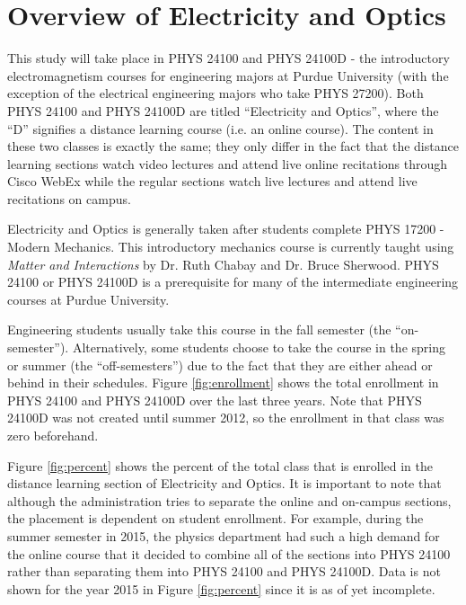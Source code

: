 \section{Overview of Electricity and Optics}

This study will take place in PHYS 24100 and PHYS 24100D - the introductory electromagnetism courses for engineering majors at Purdue University (with the exception of the electrical engineering majors who take PHYS 27200). Both PHYS 24100 and PHYS 24100D are titled ``Electricity and Optics'', where the ``D'' signifies a distance learning course (i.e. an online course). The content in these two classes is exactly the same; they only differ in the fact that the distance learning sections watch video lectures and attend live online recitations through Cisco WebEx while the regular sections watch live lectures and attend live recitations on campus.

Electricity and Optics is generally taken after students complete PHYS 17200 - Modern Mechanics. This introductory mechanics course is currently taught using \textit{Matter and Interactions} by Dr. Ruth Chabay and Dr. Bruce Sherwood\cite{chabay2010}. PHYS 24100 or PHYS 24100D is a prerequisite for many of the intermediate engineering courses at Purdue University.

Engineering students usually take this course in the fall semester (the ``on-semester''). Alternatively, some students choose to take the course in the spring or summer (the ``off-semesters'') due to the fact that they are either ahead or behind in their schedules. Figure \ref{fig:enrollment} shows the total enrollment in PHYS 24100 and PHYS 24100D over the last three years. Note that PHYS 24100D was not created until summer 2012, so the enrollment in that class was zero beforehand.

Figure \ref{fig:percent} shows the percent of the total class that is enrolled in the distance learning section of Electricity and Optics. It is important to note that although the administration tries to separate the online and on-campus sections, the placement is dependent on student enrollment. For example, during the summer semester in 2015, the physics department had such a high demand for the online course that it decided to combine all of the sections into PHYS 24100 rather than separating them into PHYS 24100 and PHYS 24100D. Data is not shown for the year 2015 in Figure \ref{fig:percent} since it is as of yet incomplete.

